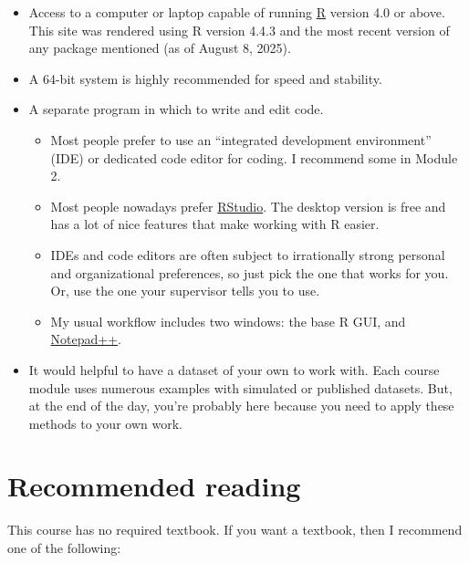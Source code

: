 \documentclass[
  13,
  letterpaper,
]{report}
\providecommand{\tightlist}{%
  \setlength{\itemsep}{0pt}\setlength{\parskip}{0pt}}
\begin{document}
\begin{itemize}
\item
  Access to a computer or laptop capable of running
  \href{https://cran.r-project.org/bin/windows/base/}{R} version 4.0 or
  above. This site was rendered using R version 4.4.3 and the most
  recent version of any package mentioned (as of August 8, 2025).
\item
  A 64-bit system is highly recommended for speed and stability.
\item
  A separate program in which to write and edit code.

  \begin{itemize}
  \tightlist
  \item
    Most people prefer to use an ``integrated development environment''
    (IDE) or dedicated code editor for coding. I recommend some in
    Module 2.
  \item
    Most people nowadays prefer
    \href{https://posit.co/download/rstudio-desktop/}{RStudio}. The
    desktop version is free and has a lot of nice features that make
    working with R easier.
  \item
    IDEs and code editors are often subject to irrationally strong
    personal and organizational preferences, so just pick the one that
    works for you. Or, use the one your supervisor tells you to use.
  \item
    My usual workflow includes two windows: the base R GUI, and
    \href{https://notepad-plus-plus.org/downloads/}{Notepad++}.
  \end{itemize}
\item
  It would helpful to have a dataset of your own to work with. Each
  course module uses numerous examples with simulated or published
  datasets. But, at the end of the day, you're probably here because you
  need to apply these methods to your own work.
\end{itemize}

\section*{Recommended reading}\label{recommended-reading}


This course has no required textbook. If you want a textbook, then I
recommend one of the following:
\end{document}
